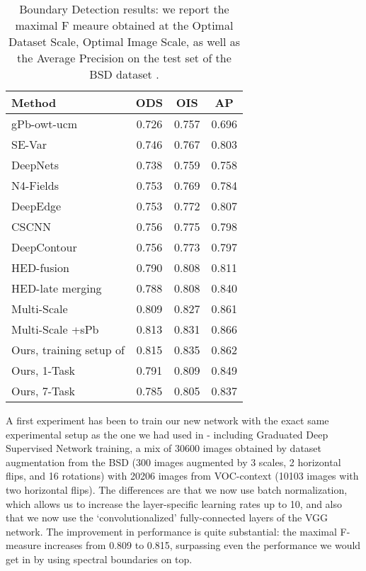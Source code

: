 \documentclass[10pt,twocolumn,letterpaper]{article}
\begin{document}
 \begin{table}[!h]
 	\begin{tabular}{|@{}l@{}|c|c|c|}
 		\hline
 		Method  & ODS & OIS  & AP \\
 		\hline
 		\hline
 		gPb-owt-ucm \cite{berkeley11}   &  0.726 & 0.757 & 0.696 \\\hline
 		SE-Var        \cite{sfs} &  0.746 & 0.767 & 0.803 \\\hline
 		DeepNets      \cite{aistat} &  0.738 & 0.759 & 0.758 \\\hline
 		N4-Fields     \cite{ganin2014n} &  0.753 & 0.769 & 0.784 \\\hline
 		DeepEdge      \cite{shi15} &  0.753 & 0.772 & 0.807 \\\hline
 		CSCNN         \cite{iclrbnd} &  0.756 & 0.775 & 0.798 \\\hline
 		DeepContour  \cite{shen2015deepcontour}  &  0.756 & 0.773 & 0.797 \\\hline
 		HED-fusion  \cite{hed} &  0.790 & 0.808 & 0.811 \\
 		HED-late merging  \cite{hed} &  0.788 & 0.808 & 0.840 \\
 		\hline
 		Multi-Scale\cite{iclr16}  & 0.809 & 0.827 & 0.861\\
 		Multi-Scale  +sPb	\cite{iclr16} & 0.813 & 0.831 & 0.866\\\hline
 		Ours, training setup of \cite{{iclr16}}  & 0.815   &  0.835 & 0.862 \\\hline
 		Ours, 1-Task  & 0.791  &  0.809 & 0.849 \\
 		Ours, 7-Task & 0.785  & 0.805 &  0.837 \\
 		\hline
 	\end{tabular}
 	\caption{Boundary Detection results: we report the maximal F meaure obtained at the Optimal Dataset Scale, Optimal Image Scale, as well as the Average Precision on the test set of the BSD dataset \cite{MFTM01}.  \label{table:hedfinal}}
 \end{table}
 
 A  first experiment has been to train our new network with the exact same experimental setup as the one we had used in \cite{iclr16} - including Graduated Deep Supervised Network training,  a mix of 30600 images obtained by dataset augmentation from the BSD (300 images augmented by 3 scales, 2 horizontal flips, and 16 rotations) with 20206 images from VOC-context (10103 images with two horizontal flips). The differences  are that we now use batch normalization, which allows us to increase the layer-specific learning rates up to 10, and also that we now use the  `convolutionalized' fully-connected layers of the VGG network. The improvement in performance is quite substantial: the maximal F-measure increases from 0.809 to 0.815, surpassing even the performance we would get in \cite{iclr16} by using spectral boundaries on top. 
 
\end{document}

